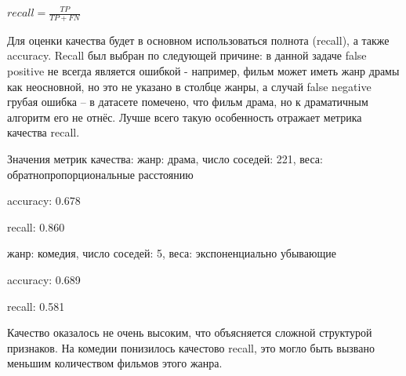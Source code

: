 \documentclass[a4paper,titlepage]{article}
\begin{document}
\begin{center}
{$recall = \frac{TP}{TP + FN}$}
\end{center}

Для оценки качества будет в основном использоваться полнота (recall), а также accuracy. Recall был выбран по следующей причине: в данной задаче false positive не всегда является ошибкой - например, фильм может иметь жанр драмы как неосновной, но это не указано в столбце жанры, а случай false negative грубая ошибка – в датасете помечено, что фильм драма, но к драматичным алгоритм его не отнёс. Лучше всего такую особенность отражает метрика качества recall.
\newpage




Значения метрик качества:
жанр: драма, число соседей: 221, веса: обратнопропорциональные расстоянию

accuracy: 0.678

recall: 0.860

жанр: комедия, число соседей: 5, веса: экспоненциально убывающие

accuracy: 0.689

recall: 0.581

Качество оказалось не очень высоким, что объясняется сложной структурой признаков. На комедии понизилось качестово recall, это могло быть вызвано меньшим количеством фильмов этого жанра.
\newpage



\end{document}
